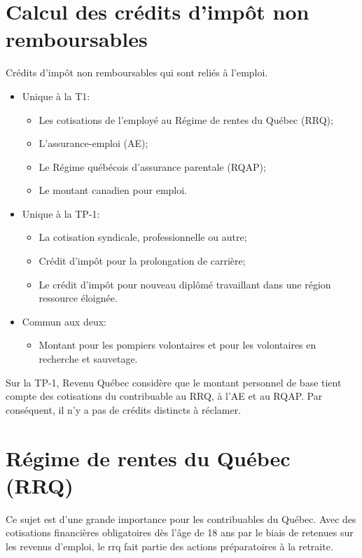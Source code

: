 \section{Calcul des crédits d'impôt non remboursables}
\begin{intro}
	Crédits d'impôt non remboursables qui sont reliés à l'emploi.
\end{intro} 
\begin{itemize}
	\item Unique à la T1:
	\begin{itemize}
		\item Les cotisations de l'employé au Régime de rentes du Québec (RRQ);
		\item L'assurance-emploi (AE);
		\item Le Régime québécois d'assurance parentale (RQAP); 
		\item Le montant canadien pour emploi.
	\end{itemize}
	\item Unique à la TP-1:
	\begin{itemize}
		\item La cotisation syndicale, professionnelle ou autre;
		\item Crédit d'impôt pour la prolongation de carrière; 
		\item Le crédit d'impôt pour nouveau diplômé travaillant dans une région ressource éloignée.
	\end{itemize}
	\item Commun aux deux:
	\begin{itemize}
		\item Montant pour les pompiers volontaires et pour les volontaires en recherche et sauvetage.
	\end{itemize}
\end{itemize}

Sur la TP-1, Revenu Québec considère que le montant personnel de base tient compte des cotisations du contribuable au RRQ, à l'AE et au RQAP. Par conséquent, il n'y a pas de crédits distincts à réclamer.



\section{Régime de rentes du Québec (RRQ)}
\begin{intro}
	Ce sujet est d'une grande importance pour les contribuables du Québec. Avec des cotisations financières obligatoires dès l'âge de 18 ans par le biais de retenues sur les revenus d'emploi, le \acrfull{rrq} fait partie des actions préparatoires à la retraite.
\end{intro}

